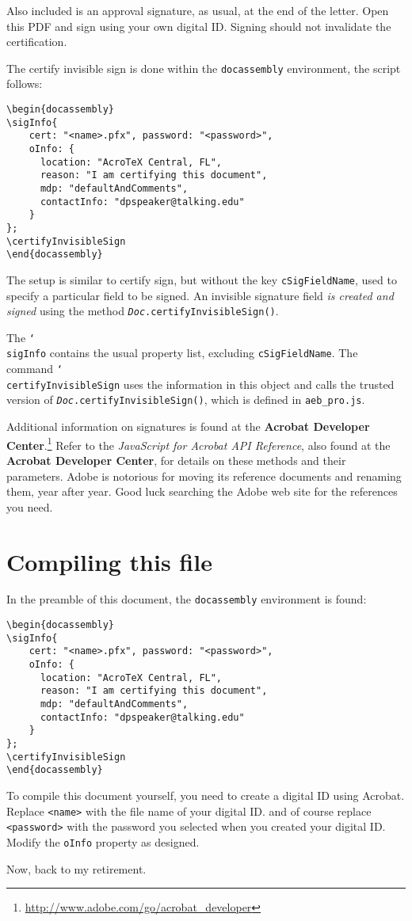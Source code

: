 \documentclass[12pt]{article}
\newcommand{\cs}[1]{\texttt{\char`\\#1}}
\begin{document}
Also included is an approval signature, as usual, at the end of the letter. Open
this PDF and sign using your own digital ID. Signing should not invalidate
the certification.

The certify invisible sign is done within the \texttt{docassembly}
environment, the script follows:
\begin{Verbatim}[xleftmargin=20pt,fontsize=\small]
\begin{docassembly}
\sigInfo{
    cert: "<name>.pfx", password: "<password>",
    oInfo: {
      location: "AcroTeX Central, FL",
      reason: "I am certifying this document",
      mdp: "defaultAndComments",
      contactInfo: "dpspeaker@talking.edu"
    }
};
\certifyInvisibleSign
\end{docassembly}
\end{Verbatim}
The setup is similar to certify sign, but without the key
\texttt{cSigFieldName}, used to specify a particular field to be signed.
An invisible signature field \emph{is created and signed} using the method
\texttt{\textsl{Doc}.certifyInvisibleSign()}.


The \cs{sigInfo} contains the usual property list, excluding
\texttt{cSigFieldName}. The command \cs{certifyInvisibleSign}
uses the information in this object and calls the trusted version
of \texttt{\textsl{Doc}.certifyInvisibleSign()}, which is defined in
\texttt{aeb\_pro.js}.

Additional information on signatures is found at the
\textbf{Acrobat Developer Center}.\footnote{\url{http://www.adobe.com/go/acrobat_developer}}
Refer to the \emph{JavaScript for Acrobat API Reference}, also found at the \textbf{Acrobat Developer Center},
for details on these methods and their parameters. Adobe is
notorious for moving its reference documents and renaming them, year after
year. Good luck searching the Adobe web site for the references you need.

\section{Compiling this file}

In the preamble of this document, the \texttt{docassembly} environment is found:
\begin{Verbatim}[xleftmargin=20pt,fontsize=\small]
\begin{docassembly}
\sigInfo{
    cert: "<name>.pfx", password: "<password>",
    oInfo: {
      location: "AcroTeX Central, FL",
      reason: "I am certifying this document",
      mdp: "defaultAndComments",
      contactInfo: "dpspeaker@talking.edu"
    }
};
\certifyInvisibleSign
\end{docassembly}
\end{Verbatim}
To compile this document yourself, you need to create a digital ID using
\textsf{Acrobat}. Replace \texttt{<name>} with the file name of your digital
ID. and of course replace \texttt{<password>} with the password you selected
when you created your digital ID. Modify the \texttt{oInfo} property as
designed.


Now, back to my retirement.
\end{document}
